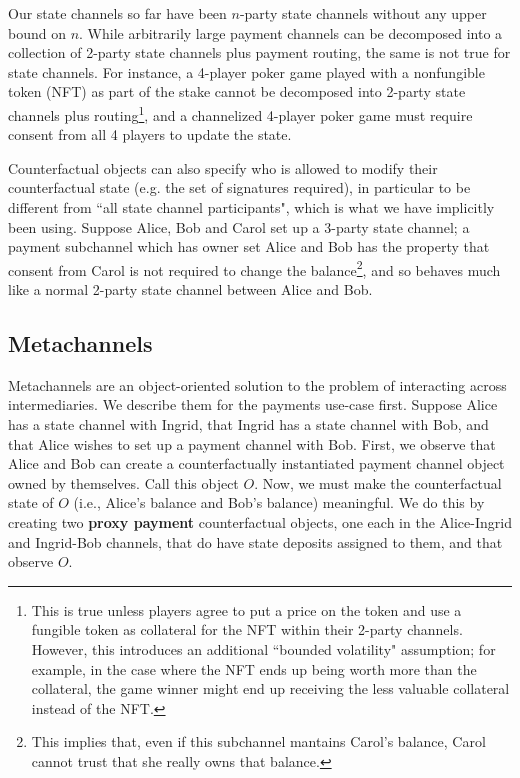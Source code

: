 \documentclass[prb,floatfix,reprint,nofootinbib,amsmath,amssymb,epsfig,pre,floats,letterpaper,groupedaffiliation,tightenlines,allcolors=blue,11pt]{revtex4}
\theoremstyle{definition}
\theoremstyle{definition}
\theoremstyle{definition}
\begin{document}
Our state channels so far have been $n$-party state channels without any upper bound on $n$. While arbitrarily large payment channels can be decomposed into a collection of 2-party state channels plus payment routing, the same is not true for state channels. For instance, a 4-player poker game played with a nonfungible token (NFT) as part of the stake cannot be decomposed into 2-party state channels plus routing\footnote{This is true unless players agree to put a price on the token and use a fungible token as collateral for the NFT within their 2-party channels. However, this introduces an additional ``bounded volatility" assumption; for example, in the case where the NFT ends up being worth more than the collateral, the game winner might end up receiving the less valuable collateral instead of the NFT.}, and a channelized 4-player poker game must require consent from all 4 players to update the state.

Counterfactual objects can also specify who is allowed to modify their counterfactual state (e.g. the set of signatures required), in particular to be different from ``all state channel participants", which is what we have implicitly been using. Suppose Alice, Bob and Carol set up a 3-party state channel; a payment subchannel which has owner set Alice and Bob has the property that consent from Carol is not required to change the balance\footnote{This implies that, even if this subchannel mantains Carol's balance, Carol cannot trust that she really owns that balance.}, and so behaves much like a normal 2-party state channel between Alice and Bob.

\subsection{Metachannels}

Metachannels are an object-oriented solution to the problem of interacting across intermediaries. We describe them for the payments use-case first. Suppose Alice has a state channel with Ingrid, that Ingrid has a state channel with Bob, and that Alice wishes to set up a payment channel with Bob. First, we observe that Alice and Bob can create a counterfactually instantiated payment channel object owned by themselves. Call this object $O$. Now, we must make the counterfactual state of $O$ (i.e., Alice's balance and Bob's balance) meaningful. We do this by creating two \textbf{proxy payment} counterfactual objects, one each in the Alice-Ingrid and Ingrid-Bob channels, that do have state deposits assigned to them, and that observe $O$.
\end{document}
